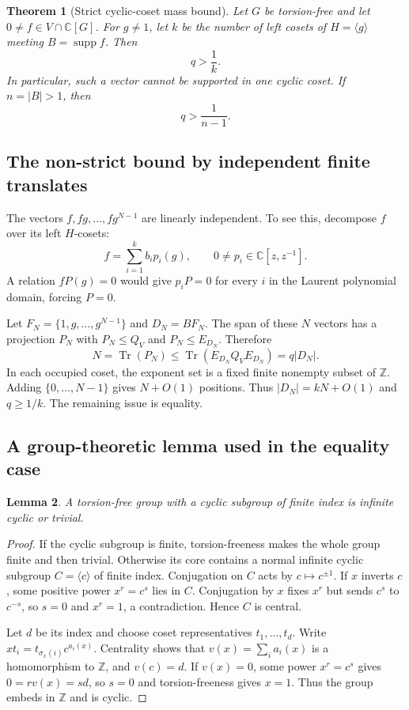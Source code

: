 \documentclass[11pt,a4paper,oneside]{report}
\newtheorem{theorem}{Theorem}[section]
\newtheorem{lemma}[theorem]{Lemma}
\theoremstyle{definition}
\theoremstyle{remark}
\DeclareMathOperator{\supp}{supp}
\DeclareMathOperator{\Tr}{Tr}
\newcommand{\C}{\mathbb C}
\newcommand{\Z}{\mathbb Z}
\begin{document}
\begin{theorem}[Strict cyclic-coset mass bound]\label{M08:thm:strict}
Let $G$ be torsion-free and let $0\ne f\in V\cap\C[G]$.
For $g\ne1$, let $k$ be the number of left cosets of
$H=\langle g\rangle$ meeting $B=\supp f$. Then
\begin{equation}\label{M08:eq:strict}
\boxed{q>\frac1k.}
\end{equation}
In particular, such a vector cannot be supported in one cyclic coset.
If $n=|B|>1$, then
\begin{equation}\label{M08:eq:terms}
\boxed{q>\frac1{n-1}.}
\end{equation}
\end{theorem}

\subsection{The non-strict bound by independent finite translates}

The vectors $f,fg,\ldots,fg^{N-1}$ are linearly independent.
To see this, decompose $f$ over its left $H$-cosets:
\[
f=\sum_{i=1}^k b_i p_i(g),
\qquad 0\ne p_i\in\C[z,z^{-1}].
\]
A relation $fP(g)=0$ would give $p_iP=0$ for every $i$ in the
Laurent polynomial domain, forcing $P=0$.

Let $F_N=\{1,g,\ldots,g^{N-1}\}$ and $D_N=BF_N$.
The span of these $N$ vectors has a projection $P_N$ with
$P_N\le Q_V$ and $P_N\le E_{D_N}$. Therefore
\[
N=\Tr(P_N)\le\Tr(E_{D_N}Q_VE_{D_N})=q|D_N|.
\]
In each occupied coset, the exponent set is a fixed finite
nonempty subset of $\Z$. Adding $\{0,\ldots,N-1\}$ gives
$N+O(1)$ positions. Thus $|D_N|=kN+O(1)$ and $q\ge1/k$.
The remaining issue is equality.

\subsection{A group-theoretic lemma used in the equality case}

\begin{lemma}\label{M08:lem:vc}
A torsion-free group with a cyclic subgroup of finite index is
infinite cyclic or trivial.
\end{lemma}
\begin{proof}
If the cyclic subgroup is finite, torsion-freeness makes the whole
group finite and then trivial. Otherwise its core contains a normal
infinite cyclic subgroup $C=\langle c\rangle$ of finite index.
Conjugation on $C$ acts by $c\mapsto c^{\pm1}$.
If $x$ inverts $c$, some positive power $x^r=c^s$ lies in $C$.
Conjugation by $x$ fixes $x^r$ but sends $c^s$ to $c^{-s}$,
so $s=0$ and $x^r=1$, a contradiction. Hence $C$ is central.

Let $d$ be its index and choose coset representatives $t_1,\ldots,t_d$.
Write
$xt_i=t_{\sigma_x(i)}c^{a_i(x)}$.
Centrality shows that $v(x)=\sum_i a_i(x)$ is a homomorphism
to $\Z$, and $v(c)=d$. If $v(x)=0$, some power $x^r=c^s$
gives $0=r v(x)=sd$, so $s=0$ and torsion-freeness gives $x=1$.
Thus the group embeds in $\Z$ and is cyclic.
\end{proof}
\end{document}
